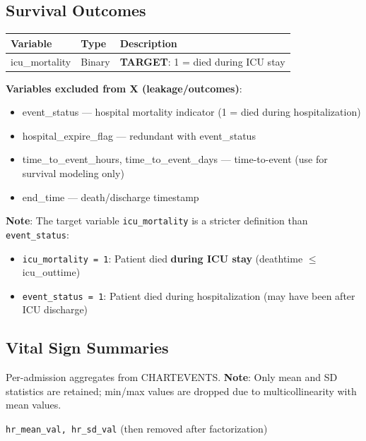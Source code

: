 \documentclass[11pt]{article}
\begin{document}
\subsection{Survival Outcomes}

\begin{longtable}{L{4cm}L{2cm}L{8cm}}
\toprule
\textbf{Variable} & \textbf{Type} & \textbf{Description} \\
\midrule
\endhead
icu\_mortality & Binary & \textbf{TARGET}: 1 = died during ICU stay \\
\bottomrule
\end{longtable}

\textbf{Variables excluded from X (leakage/outcomes)}:
\begin{itemize}[leftmargin=*, nosep]
    \item event\_status --- hospital mortality indicator (1 = died during hospitalization)
    \item hospital\_expire\_flag --- redundant with event\_status
    \item time\_to\_event\_hours, time\_to\_event\_days --- time-to-event (use for survival modeling only)
    \item end\_time --- death/discharge timestamp
\end{itemize}

\textbf{Note}: The target variable \texttt{icu\_mortality} is a stricter definition than \texttt{event\_status}:
\begin{itemize}[leftmargin=*, nosep]
    \item \texttt{icu\_mortality = 1}: Patient died \textbf{during ICU stay} (deathtime $\leq$ icu\_outtime)
    \item \texttt{event\_status = 1}: Patient died during hospitalization (may have been after ICU discharge)
\end{itemize}

\subsection{Vital Sign Summaries}

Per-admission aggregates from CHARTEVENTS. \textbf{Note}: Only mean and SD statistics are retained; min/max values are dropped due to multicollinearity with mean values.

\begin{center}
\texttt{hr\_mean\_val, hr\_sd\_val} (then removed after factorization)
\end{center}
\end{document}
